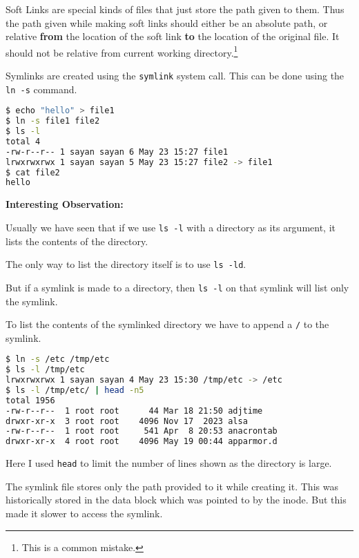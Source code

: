 \begin{definition}
  Soft Links are special kinds of files that just store the path
  given to them. Thus the path given while making soft links should
  either be an absolute path, or relative \textbf{from} the location of the
  soft link \textbf{to} the location of the original file. It should not be
  relative from current working directory.\footnote{This is a common mistake.}
\end{definition}

Symlinks are created using the \texttt{symlink} system call.
This can be done using the \texttt{ln -s} command.

\begin{lstlisting}[language=bash]
$ echo "hello" > file1
$ ln -s file1 file2
$ ls -l
total 4
-rw-r--r-- 1 sayan sayan 6 May 23 15:27 file1
lrwxrwxrwx 1 sayan sayan 5 May 23 15:27 file2 -> file1
$ cat file2
hello
\end{lstlisting}

\textbf{Interesting Observation:}

Usually we have seen that if we use \texttt{ls -l} with a directory as its argument,
it lists the contents of the directory.

The only way to list the directory itself is to use \texttt{ls -ld}.

But if a symlink is made to a directory, then \texttt{ls -l} on that symlink will list only the symlink.

To list the contents of the symlinked directory we have to append a \texttt{/} to the symlink.

\begin{lstlisting}[language=bash]
$ ln -s /etc /tmp/etc
$ ls -l /tmp/etc
lrwxrwxrwx 1 sayan sayan 4 May 23 15:30 /tmp/etc -> /etc
$ ls -l /tmp/etc/ | head -n5
total 1956
-rw-r--r--  1 root root      44 Mar 18 21:50 adjtime
drwxr-xr-x  3 root root    4096 Nov 17  2023 alsa
-rw-r--r--  1 root root     541 Apr  8 20:53 anacrontab
drwxr-xr-x  4 root root    4096 May 19 00:44 apparmor.d
\end{lstlisting}

Here I used \texttt{head} to limit the number of lines shown as the directory is large.

The symlink file stores only the path provided to it while creating it.
This was historically stored in the data block which was pointed to by the inode.
But this made it slower to access the symlink.

